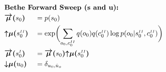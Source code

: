 \documentclass[fleqn]{article}
\begin{document}
\noindent
\setlength{\jot}{0.3em}
\begin{alignat}{2}
     & \rlap{\text{\bfseries Bethe Forward Sweep (s and u):}} \nonumber                                                                                                                                                                                                                                                                                                                                                                                                                                                                     \\
     & \bm{\overrightarrow{\mu}(}s_0\bm{)}                                                                                                                                                                                                                                                                                                                &  & = p(s_0)                                                                                                                                                                     \\
     & \bm{{\uparrow}{\mu}(}s^{\scriptscriptstyle II}_0\bm{)}                                                                                                                                                                                                                                                                                             &  & = \exp \biggl( \sum_{o_0,c^{\scriptscriptstyle II}_0} q(o_0)q(c^{\scriptscriptstyle II}_0) \log p(o_0|s^{\scriptscriptstyle II}_0,c^{\scriptscriptstyle II}_0) \biggr)       \\
     & \bm{\overrightarrow{\mu}(}s^{\scriptscriptstyle I}_0\bm{)}                                                                                                                                                                                                                                                                                         &  & = \bm{\overrightarrow{\mu}(}s_0\bm{)} \bm{{\uparrow}{\mu}(}s^{\scriptscriptstyle II}_0\bm{)}                                                                                 \\
     & \bm{{\downarrow}{\mu}(}u_0\bm{)}                                                                                                                                                                                                                                                                                                                   &  & = \delta_{u_0,\hat{u}_o}                                                                                                                                                     \\

\end{alignat}
\end{document}
